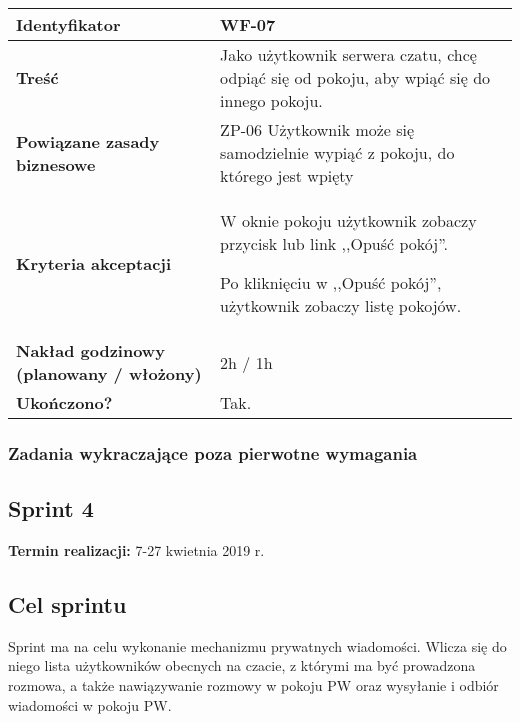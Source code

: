 \begin{tabular}{ | l | l | }
	\hline
		\textbf{Identyfikator} &
		WF-07
		\\

	\hline
		\textbf{Treść} & \parbox[t]{11.5cm}{\strut
			Jako użytkownik serwera czatu, chcę odpiąć się od pokoju,
			aby wpiąć się do innego pokoju.
		\strut}\\

	\hline
		\parbox[t]{4cm}{\textbf{Powiązane zasady biznesowe}} & \parbox[t]{11.5cm}{\strut
			ZP-06 Użytkownik może się samodzielnie wypiąć z pokoju,
			do którego jest wpięty

		\strut}\\

	\hline
		\parbox[t]{4cm}{\textbf{Kryteria akceptacji}} & \parbox[t]{11.5cm}{\strut
			\begin{enumreq}
				\item W oknie pokoju użytkownik zobaczy przycisk
				lub link ,,Opuść pokój''.
				\item Po kliknięciu w ,,Opuść pokój'', użytkownik
				zobaczy listę pokojów.
			\end{enumreq}
			\strut}
		\\

    \hline
      \parbox[t]{4cm}{\textbf{Nakład godzinowy (planowany / włożony)}} &
      \parbox[t]{11.5cm}{\strut
        2h / 1h
      \strut}\\

      \hline
        \parbox[t]{4cm}{\textbf{Ukończono?}} &
        \parbox[t]{11.5cm}{\strut
          Tak.
        \strut}\\
	\hline
\end{tabular}

\subsubsection{Zadania wykraczające poza pierwotne wymagania}

\subsection{Sprint 4}

\textbf{Termin realizacji:} 7-27 kwietnia 2019 r.

\subsection{Cel sprintu}
Sprint ma na celu wykonanie mechanizmu prywatnych wiadomości. Wlicza się do
niego lista użytkowników obecnych na czacie, z którymi ma być prowadzona
rozmowa, a także nawiązywanie rozmowy w pokoju PW oraz wysyłanie i odbiór
wiadomości w pokoju PW.

